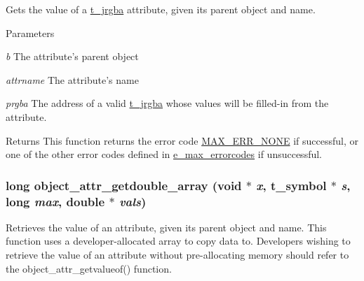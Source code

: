 Gets the value of a \hyperlink{structt__jrgba}{t\_\-jrgba} attribute, given its parent object and name. 
\begin{DoxyParams}{Parameters}
\item[{\em b}]The attribute's parent object \item[{\em attrname}]The attribute's name \item[{\em prgba}]The address of a valid \hyperlink{structt__jrgba}{t\_\-jrgba} whose values will be filled-\/in from the attribute.\end{DoxyParams}
\begin{DoxyReturn}{Returns}
This function returns the error code \hyperlink{group__misc_gga0764dd6c02b76cca7d053ae50555d69da6d22f77fef8b1e1b074cef5d29d935fd}{MAX\_\-ERR\_\-NONE} if successful, or one of the other error codes defined in \hyperlink{group__misc_ga0764dd6c02b76cca7d053ae50555d69d}{e\_\-max\_\-errorcodes} if unsuccessful. 
\end{DoxyReturn}
\hypertarget{group__attr_ga003a3c47690732e8fda896eb4bba91ed}{
\subsubsection[{object\_\-attr\_\-getdouble\_\-array}]{\setlength{\rightskip}{0pt plus 5cm}long object\_\-attr\_\-getdouble\_\-array (void $\ast$ {\em x}, \/  {\bf t\_\-symbol} $\ast$ {\em s}, \/  long {\em max}, \/  double $\ast$ {\em vals})}}
\label{group__attr_ga003a3c47690732e8fda896eb4bba91ed}


Retrieves the value of an attribute, given its parent object and name. This function uses a developer-\/allocated array to copy data to. Developers wishing to retrieve the value of an attribute without pre-\/allocating memory should refer to the object\_\-attr\_\-getvalueof() function.


